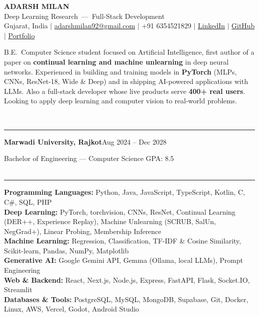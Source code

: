 \documentclass[10pt,a4paper]{article}
\renewcommand{\section}[1]{\vspace{6pt}{\large\bfseries\MakeUppercase{#1}}\\[-7pt]\rule{\textwidth}{0.6pt}\vspace{2pt}}
\newcommand{\entry}[2]{\par\textbf{#1}\hfill #2\par}
\newcommand{\sep}{\enspace$|$\enspace}
\begin{document}
\begin{center}
  {\Huge\bfseries ADARSH MILAN}\\[3pt]
  {\large Deep Learning Research \,---\, Full-Stack Development}\\[3pt]
  Gujarat, India \sep
  \href{mailto:adarshmilan92@gmail.com}{adarshmilan92@gmail.com} \sep
  +91 6354521829 \sep
  \href{https://www.linkedin.com/in/adarsh-milan-383527304}{LinkedIn} \sep
  \href{https://github.com/Adarshmilan}{GitHub} \sep
  \href{https://portfoliyo-zeta-indol.vercel.app/}{Portfolio}
\end{center}

B.E.\ Computer Science student focused on Artificial Intelligence, first author of a paper on
\textbf{continual learning and machine unlearning} in deep neural networks. Experienced in building and training
models in \textbf{PyTorch} (MLPs, CNNs, ResNet-18, Wide \& Deep) and in shipping AI-powered applications with LLMs.
Also a full-stack developer whose live products serve \textbf{400+ real users}. Looking to apply deep learning
and computer vision to real-world problems.

\section{Education}
\entry{Marwadi University, Rajkot}{Aug 2024 -- Dec 2028}
Bachelor of Engineering --- Computer Science \hfill GPA: 8.5\\

\section{Skills}
\textbf{Programming Languages:} Python, Java, JavaScript, TypeScript, Kotlin, C, C\#, SQL, PHP\\
\textbf{Deep Learning:} PyTorch, torchvision, CNNs, ResNet, Continual Learning (DER++, Experience Replay), Machine Unlearning (SCRUB, SalUn, NegGrad+), Linear Probing, Membership Inference\\
\textbf{Machine Learning:} Regression, Classification, TF-IDF \& Cosine Similarity, Scikit-learn, Pandas, NumPy, Matplotlib\\
\textbf{Generative AI:} Google Gemini API, Gemma (Ollama, local LLMs), Prompt Engineering\\
\textbf{Web \& Backend:} React, Next.js, Node.js, Express, FastAPI, Flask, Socket.IO, Streamlit\\
\textbf{Databases \& Tools:} PostgreSQL, MySQL, MongoDB, Supabase, Git, Docker, Linux, AWS, Vercel, Godot, Android Studio\\
\end{document}
